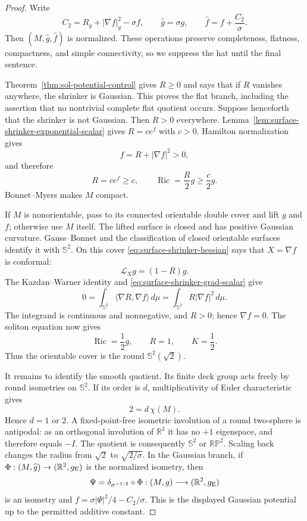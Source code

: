 \documentclass[10pt]{coll-l}
\newcommand{\R}{\mathbb{R}}
\newcommand{\Sph}{\mathbb{S}}
\theoremstyle{definition}
\theoremstyle{remark}
\numberwithin{section}{chapter}
\numberwithin{equation}{chapter}
\newcommand{\Ric}{\operatorname{Ric}}
\begin{document}
\begin{proof}
Write
\[
 C_2=R_g+|\nabla f|_g^2-\sigma f,
 \qquad \widehat g=\sigma g,
 \qquad \widehat f=f+\frac{C_2}{\sigma}.
\]
Then $(M,\widehat g,\widehat f)$ is normalized.  These operations preserve completeness,
flatness, compactness, and simple connectivity, so we suppress the hat until
the final sentence.

Theorem~\ref{thm:sol-potential-control} gives $R\geq0$ and says that if $R$
vanishes anywhere, the shrinker is Gaussian.  This proves the flat branch,
including the assertion that no nontrivial complete flat quotient occurs.
Suppose henceforth that the shrinker is not Gaussian.  Then $R>0$ everywhere.
Lemma~\ref{lem:surface-shrinker-exponential-scalar} gives
$R=ce^f$ with $c>0$.  Hamilton normalization gives
\[
                         f=R+|\nabla f|^2>0,
\]
and therefore
\begin{equation}
                 R=ce^f\geq c,
        \qquad   \Ric=\frac R2g\geq\frac c2g.             \label{eq:surface-shrinker-positive-lower}
\end{equation}
Bonnet--Myers makes $M$ compact.

If $M$ is nonorientable, pass to its connected orientable double cover and
lift $g$ and $f$; otherwise use $M$ itself.  The lifted surface is closed and
has positive Gaussian curvature.  Gauss--Bonnet and the classification of
closed orientable surfaces identify it with $\Sph^2$.  On this cover
\eqref{eq:surface-shrinker-hessian} says that $X=\nabla f$ is conformal:
\[
                       \mathcal L_Xg=(1-R)g.
\]
The Kazdan--Warner identity and
\eqref{eq:surface-shrinker-grad-scalar} give
\[
 0=\int_{\Sph^2}\langle\nabla R,\nabla f\rangle\,d\mu
   =\int_{\Sph^2}R|\nabla f|^2\,d\mu.
\]
The integrand is continuous and nonnegative, and $R>0$; hence
$\nabla f=0$.  The soliton equation now gives
\[
                    \Ric=\frac12g,
             \qquad R=1,
             \qquad K=\frac12.                           \label{eq:surface-shrinker-round-data}
\]
Thus the orientable cover is the round $\Sph^2(\sqrt2)$.

It remains to identify the smooth quotient.  Its finite deck group acts
freely by round isometries on $\Sph^2$.  If its order is $d$, multiplicativity
of Euler characteristic gives
\[
                         2=d\,\chi(M).
\]
Hence $d=1$ or $2$.  A fixed-point-free isometric involution of a round
two-sphere is antipodal: as an orthogonal involution of $\R^3$ it has no
$+1$ eigenspace, and therefore equals $-I$.  The quotient is consequently
$\Sph^2$ or $\mathbb{RP}^2$.  Scaling back changes the radius from $\sqrt2$
to $\sqrt{2/\sigma}$.  In the Gaussian branch, if
$\Phi:(M,\widehat g)\to(\R^2,g_{\rm E})$ is the normalized isometry, then
\[
       \Psi=\delta_{\sigma^{-1/2}}\circ\Phi:(M,g)
             \longrightarrow(\R^2,g_{\rm E})
\]
is an isometry and
$f=\sigma|\Psi|^2/4-C_2/\sigma$.  This is the displayed Gaussian
potential up to the permitted additive constant.
\end{proof}
\end{document}
